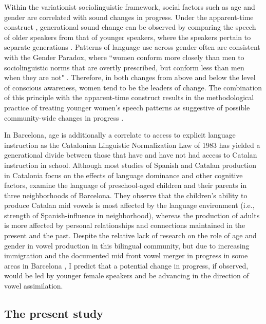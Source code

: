 \documentclass[output=paper,colorlinks,citecolor=brown,draftmode]{langscibook}
\begin{document}
Within the variationist sociolinguistic framework, social factors such as age and gender are correlated with sound changes in progress. Under the apparent-time construct \citep{bailey2004real}, generational sound change can be observed by comparing the speech of older speakers from that of younger speakers, where the speakers pertain to separate generations \citep[][45--46]{labov1994principles}. Patterns of language use across gender often are consistent with the Gender Paradox, where ``women conform more closely than men to sociolinguistic norms that are overtly prescribed, but conform less than men when they are not" \citep[][292--293]{labov2001principles}. Therefore, in both changes from above and below the level of conscious awareness, women tend to be the leaders of change. The combination of this principle with the apparent-time construct results in the methodological practice of treating younger women's speech patterns as suggestive of possible community-wide changes in progress \citep[][279]{labov2001principles}.

In Barcelona, age is additionally a correlate to access to explicit language instruction as the Catalonian Linguistic Normalization Law of 1983 has yielded a generational divide between those that have and have not had access to Catalan instruction in school. Although most studies of Spanish and Catalan production in Catalonia focus on the effects of language dominance and other cognitive factors, \citet{cortes2019weighing} examine the language of preschool-aged children and their parents in three neighborhoods of Barcelona. They observe that the children's ability to produce Catalan mid vowels is most affected by the language environment (i.e., strength of Spanish-influence in neighborhood), whereas the production of adults is more affected by personal relationships and connections maintained in the present and the past. Despite the relative lack of research on the role of age and gender in vowel production in this bilingual community, but due to increasing immigration and the documented mid front vowel merger in progress in some areas in Barcelona \citep{mora2012}, I predict that a potential change in progress, if observed, would be led by younger female speakers and be advancing in the direction of vowel assimilation.

\subsection{The present study}
\end{document}
